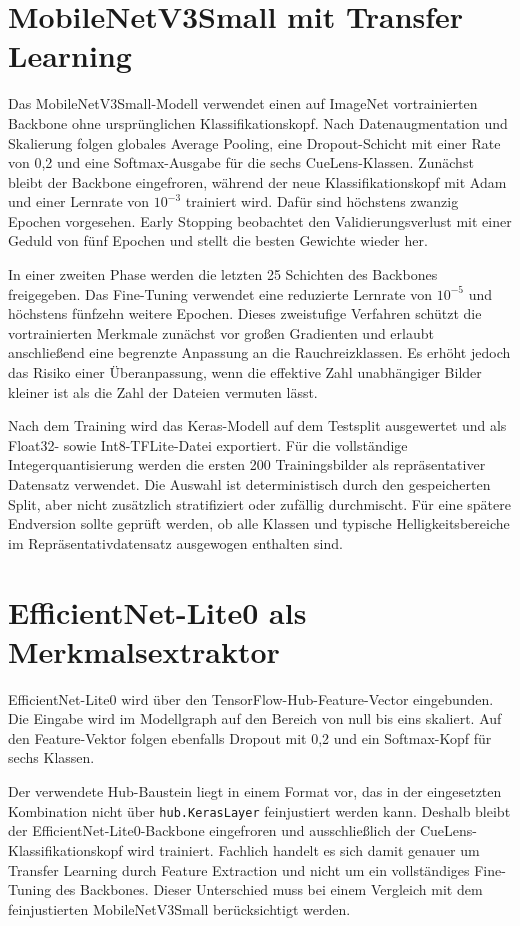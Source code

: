 \section{MobileNetV3Small mit Transfer Learning}

Das MobileNetV3Small-Modell verwendet einen auf ImageNet vortrainierten Backbone ohne ursprünglichen Klassifikationskopf. Nach Datenaugmentation und Skalierung folgen globales Average Pooling, eine Dropout-Schicht mit einer Rate von 0,2 und eine Softmax-Ausgabe für die sechs CueLens-Klassen. Zunächst bleibt der Backbone eingefroren, während der neue Klassifikationskopf mit Adam und einer Lernrate von \(10^{-3}\) trainiert wird. Dafür sind höchstens zwanzig Epochen vorgesehen. Early Stopping beobachtet den Validierungsverlust mit einer Geduld von fünf Epochen und stellt die besten Gewichte wieder her.

In einer zweiten Phase werden die letzten 25 Schichten des Backbones freigegeben. Das Fine-Tuning verwendet eine reduzierte Lernrate von \(10^{-5}\) und höchstens fünfzehn weitere Epochen. Dieses zweistufige Verfahren schützt die vortrainierten Merkmale zunächst vor großen Gradienten und erlaubt anschließend eine begrenzte Anpassung an die Rauchreizklassen. Es erhöht jedoch das Risiko einer Überanpassung, wenn die effektive Zahl unabhängiger Bilder kleiner ist als die Zahl der Dateien vermuten lässt.

Nach dem Training wird das Keras-Modell auf dem Testsplit ausgewertet und als Float32- sowie Int8-TFLite-Datei exportiert. Für die vollständige Integerquantisierung werden die ersten 200 Trainingsbilder als repräsentativer Datensatz verwendet. Die Auswahl ist deterministisch durch den gespeicherten Split, aber nicht zusätzlich stratifiziert oder zufällig durchmischt. Für eine spätere Endversion sollte geprüft werden, ob alle Klassen und typische Helligkeitsbereiche im Repräsentativdatensatz ausgewogen enthalten sind.

\section{EfficientNet-Lite0 als Merkmalsextraktor}

EfficientNet-Lite0 wird über den TensorFlow-Hub-Feature-Vector  eingebunden. Die Eingabe wird im Modellgraph auf den Bereich von null bis eins skaliert. Auf den Feature-Vektor folgen ebenfalls Dropout mit 0,2 und ein Softmax-Kopf für sechs Klassen.

Der verwendete Hub-Baustein liegt in einem Format vor, das in der eingesetzten Kombination nicht über \texttt{hub.KerasLayer} feinjustiert werden kann. Deshalb bleibt der EfficientNet-Lite0-Backbone eingefroren und ausschließlich der CueLens-Klassifikationskopf wird trainiert. Fachlich handelt es sich damit genauer um Transfer Learning durch Feature Extraction und nicht um ein vollständiges Fine-Tuning des Backbones. Dieser Unterschied muss bei einem Vergleich mit dem feinjustierten MobileNetV3Small berücksichtigt werden.

